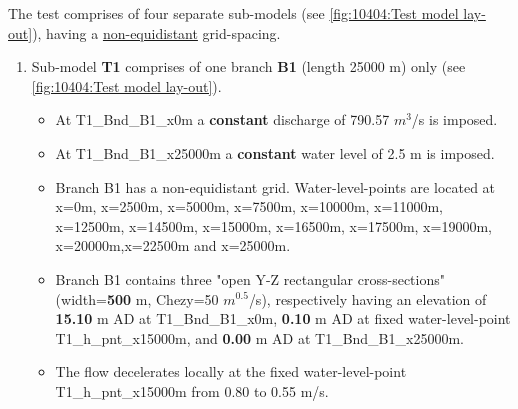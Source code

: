 The test comprises of four separate sub-models (see \autoref{fig:10404:Test model lay-out}), having a \underline{non-equidistant} grid-spacing.
\begin{enumerate}
	\item Sub-model \textbf{\textcolor[rgb]{1,0,0}{T1}} comprises of one branch \textbf{B1} (length 25000 m) only (see \autoref{fig:10404:Test model lay-out}).
		\begin{itemize}
			\item At T1\_Bnd\_B1\_x0m a \textbf{constant} discharge of 790.57 $m^3$/s is imposed. 
			\item At T1\_Bnd\_B1\_x25000m a \textbf{constant} water level of 2.5 m is imposed.
			\item Branch B1 has a non-equidistant grid. Water-level-points are located at x=0m, x=2500m, x=5000m, x=7500m, x=10000m, x=11000m, x=12500m, x=14500m, x=15000m, x=16500m, x=17500m, x=19000m, x=20000m,x=22500m and x=25000m.
			\item Branch B1 contains three "open Y-Z rectangular cross-sections" (width=\textcolor[rgb]{0.071,0,1}{\textcolor[rgb]{0.5,0,0.15}{\textbf{500}}} m, Chezy=50 $m^{0.5}$/s), respectively having an elevation of \textbf{15.10} m AD at T1\_Bnd\_B1\_x0m, \textbf{0.10} m AD at fixed water-level-point T1\_h\_pnt\_x15000m, and \textbf{0.00} m AD at \newline T1\_Bnd\_B1\_x25000m. 
			\item The flow decelerates locally at the fixed water-level-point T1\_h\_pnt\_x15000m from 0.80 to 0.55 m/s.
		\end{itemize} \



\end{enumerate}
